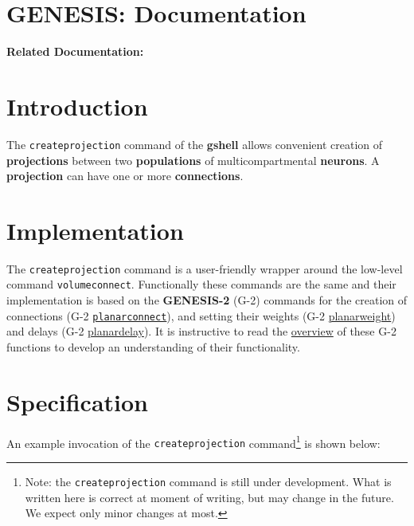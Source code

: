 \documentclass[12pt]{article}
\begin{document}
\section*{GENESIS: Documentation}

{\bf Related Documentation:} \\

\section*{Introduction}

The {\tt createprojection} command of the {\bf gshell} allows
convenient creation of {\bf projections} between two {\bf populations}
of multicompartmental {\bf neurons}.  A {\bf projection} can have one
or more {\bf connections}.

\section*{Implementation}

The {\tt createprojection} command is a user-friendly wrapper around
the low-level command {\tt volumeconnect}.  Functionally these
commands are the same and their implementation is based on the {\bf
  GENESIS-2} (G-2) commands for the creation of connections (G-2
\href{http://www.genesis-sim.org/GENESIS/UGTD/Tutorials/genprog/textDoc/planarconnect.doc.txt}{
  {\tt planarconnect}}), and setting their weights (G-2
\href{http://www.genesis-sim.org/GENESIS/UGTD/Tutorials/genprog/textDoc/planarweight.doc.txt}{
  {planarweight}}) and delays (G-2
\href{http://www.genesis-sim.org/GENESIS/UGTD/Tutorials/genprog/textDoc/planardelay.doc.txt}{
  {planardelay}}).  It is instructive to read the
\href{http://www.genesis-sim.org/GENESIS/UGTD/Tutorials/genprog/net-tut.html}{overview}
of these G-2 functions to develop an understanding of their
functionality.


\section*{Specification}

An example invocation of the {\tt createprojection}
command\footnote{Note: the {\tt createprojection} command is still
  under development.  What is written here is correct at moment of
  writing, but may change in the future.  We expect only minor changes
  at most.} is shown below:
\end{document}
